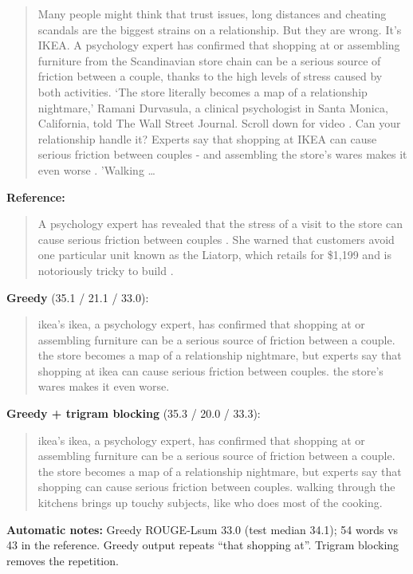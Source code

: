 \documentclass[10pt,a4paper]{article}
\begin{document}
\begin{quote}
Many people might think that trust issues, long distances and cheating scandals are the biggest strains on a relationship. But they are wrong. It's IKEA. A psychology expert has confirmed that shopping at or assembling furniture from the Scandinavian store chain can be a serious source of friction between a couple, thanks to the high levels of stress caused by both activities. `The store literally becomes a map of a relationship nightmare,' Ramani Durvasula, a clinical psychologist in Santa Monica, California, told The Wall Street Journal. Scroll down for video . Can your relationship handle it? Experts say that shopping at IKEA can cause serious friction between couples - and assembling the store's wares makes it even worse . 'Walking \ldots{}
\end{quote}

\textbf{Reference:}

\begin{quote}
A psychology expert has revealed that the stress of a visit to the store can cause serious friction between couples .
She warned that customers avoid one particular unit known as the Liatorp, which retails for \$1,199 and is notoriously tricky to build .
\end{quote}

\textbf{Greedy} (35.1 / 21.1 / 33.0):

\begin{quote}
ikea's ikea, a psychology expert, has confirmed that shopping at or assembling furniture can be a serious source of friction between a couple.
the store becomes a map of a relationship nightmare, but experts say that shopping at ikea can cause serious friction between couples.
the store's wares makes it even worse.
\end{quote}

\textbf{Greedy + trigram blocking} (35.3 / 20.0 / 33.3):

\begin{quote}
ikea's ikea, a psychology expert, has confirmed that shopping at or assembling furniture can be a serious source of friction between a couple.
the store becomes a map of a relationship nightmare, but experts say that shopping can cause serious friction between couples.
walking through the kitchens brings up touchy subjects, like who does most of the cooking.
\end{quote}

\textbf{Automatic notes:} Greedy ROUGE-Lsum 33.0 (test median 34.1); 54 words vs 43 in the reference. Greedy output repeats ``that shopping at''. Trigram blocking removes the repetition.
\end{document}

